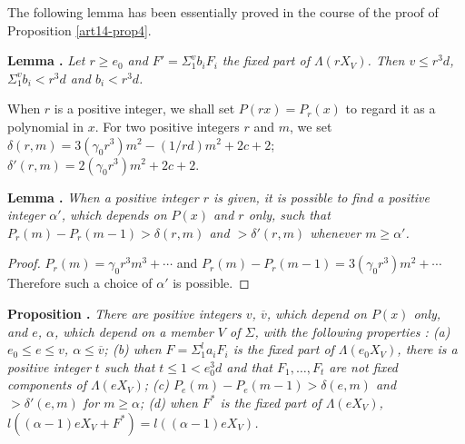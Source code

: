 The following lemma has been essentially proved in the course of the proof of Proposition \ref{art14-prop4}.

\medskip
\noindent
{\bf Lemma .\label{art14-lem6}}
{\em Let $r\geq e_{0}$ and $F'=\Sigma^{v}_{1}b_{i}F_{i}$ the fixed part of $\Lambda (rX_{V})$. Then $v\leq r^{3}d$, $\Sigma^{v}_{1}b_{i}<r^{3}d$ and $b_{i}<r^{3}d$.}
\smallskip

When $r$ is a positive integer, we shall set $P(rx)=P_{r}(x)$ to regard it as a polynomial in $x$. For two positive integers $r$ and $m$, we set $\delta(r,m)=3(\gamma_{0}r^{3})m^{2}-(1/rd)m^{2}+2c+2$; $\delta'(r,m)=2(\gamma_{0}r^{3})m^{2}+2c+2$.

\medskip
\noindent
{\bf Lemma .\label{art14-lem7}}
{\em When a positive integer $r$ is given, it is possible to find a positive integer $\alpha'$, which depends on $P(x)$ and $r$ only, such that $P_{r}(m)-P_{r}(m-1)>\delta(r,m)$ and $>\delta'(r,m)$ whenever $m\geq \alpha'$.}

\begin{proof}
$P_{r}(m)=\gamma_{0}r^{3}m^{3}+\cdots$ and $P_{r}(m)-P_{r}(m-1)=3(\gamma_{0}r^{3})m^{2}+\cdots$ Therefore such a choice of $\alpha'$ is possible.
\end{proof}

\medskip
\noindent
{\bf Proposition .\label{art14-prop6}}
{\em There are positive integers $v$, $\overline{v}$, which depend on $P(x)$ only, and $e$, $\alpha$, which depend on a member $V$ of $\Sigma$, with the following properties : {\rm(a)} $e_{0}\leq e\leq v$, $\alpha \leq \overline{v}$; {\rm(b)} when $F=\Sigma^{l}_{1}a_{i}F_{i}$ is the fixed part of $\Lambda(e_{0}X_{V})$, there is a positive integer $t$ such that $t\leq 1<e^{3}_{0}d$ and that $F_{1},\ldots,F_{t}$ are not fixed components of $\Lambda(eX_{V})$; {\rm(c)} $P_{e}(m)-P_{e}(m-1)>\delta (e,m)$ and $>\delta'(e,m)$ for $m\geq \alpha$; {\rm(d)} when $F^{*}$ is the fixed part of $\Lambda(eX_{V})$, $l((\alpha-1)eX_{V}+F^{*})=l((\alpha-1)eX_{V})$.}

